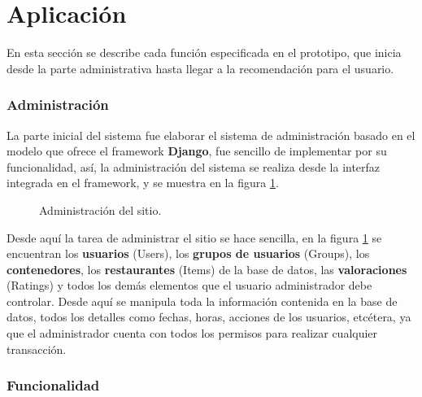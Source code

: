 \documentclass[12pt,letterpaper,oneside] {memoir}
\begin{document}
\section{Aplicación}

En esta sección se describe cada función especificada en el prototipo, que inicia desde la parte administrativa hasta llegar a la recomendación para el usuario.

\subsubsection{Administración}
La parte inicial del sistema fue elaborar el sistema de administración basado en el modelo que ofrece el framework \textbf{Django},  fue sencillo de implementar por su funcionalidad, así, la administración del sistema se realiza desde la interfaz integrada en el framework, y se muestra en la figura  \ref{fig:p1}.

\begin{figure}[H]
\centering 
{} \caption{Administración del sitio.} 
\label{fig:p1} 
\end{figure}

Desde aquí la tarea de administrar el sitio se hace sencilla, en la figura \ref{fig:p1} se encuentran los \textbf{usuarios} (Users), los \textbf{grupos de usuarios} (Groups), los \textbf{contenedores}, los \textbf{restaurantes} (Items) de la base de datos, las \textbf{valoraciones} (Ratings) y todos los demás elementos que el usuario administrador debe controlar.  Desde aquí se manipula toda la información contenida en la base de datos, todos los detalles como fechas, horas, acciones de los usuarios, etcétera, ya que el administrador cuenta con todos los permisos para realizar cualquier transacción.

\subsubsection{Funcionalidad}
\end{document}
